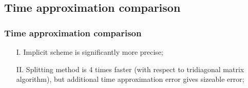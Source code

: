 \documentclass[9pt, apectratio=43,unicode]{beamer}
\begin{document}
\subsection{Time approximation comparison}
\begin{frame}\frametitle{Time approximation comparison}

\begin{itemize}

\item[I.] Implicit scheme is significantly more precise;

\item[II.] Splitting method is 4 times faster (with respect to tridiagonal matrix algorithm), but additional time approximation error gives sizeable error;

\end{itemize}

\begin{figure}[H]
\begin{minipage}[c]{0.490\linewidth}
\flushleft
{}
\end{minipage}
\hfill
\begin{minipage}[c]{0.490\linewidth}
\flushleft
{}
\end{minipage}
\end{figure}


\end{frame}
\end{document}
